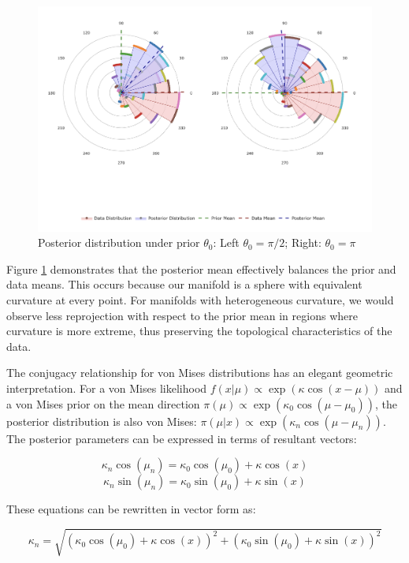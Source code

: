 \documentclass[twoside,11pt]{article}
\begin{document}
\begin{figure}[h!]
  \begin{center}
    \includegraphics[width=1\textwidth]{../fig/posterior-roseplot.png}
  \end{center}
  \caption{Posterior distribution under prior $\theta_0$: Left $\theta_0 = \pi/2$; Right: $\theta_0 = \pi$}\label{fig:posteriors}
\end{figure}

Figure \ref{fig:posteriors} demonstrates that the posterior mean effectively balances the prior and data means. This occurs because our manifold is a sphere with equivalent curvature at every point. For manifolds with heterogeneous curvature, we would observe less reprojection with respect to the prior mean in regions where curvature is more extreme, thus preserving the topological characteristics of the data.

The conjugacy relationship for von Mises distributions has an elegant geometric interpretation. For a von Mises likelihood $f(x|\mu) \propto \exp(\kappa \cos(x-\mu))$ and a von Mises prior on the mean direction $\pi(\mu) \propto \exp(\kappa_0 \cos(\mu-\mu_0))$, the posterior distribution is also von Mises: $\pi(\mu|x) \propto \exp(\kappa_n \cos(\mu-\mu_n))$. The posterior parameters can be expressed in terms of resultant vectors:

$$\kappa_n\cos(\mu_n) = \kappa_0\cos(\mu_0) + \kappa\cos(x)$$
$$\kappa_n\sin(\mu_n) = \kappa_0\sin(\mu_0) + \kappa\sin(x)$$

These equations can be rewritten in vector form as:

$$\kappa_n = \sqrt{(\kappa_0\cos(\mu_0) + \kappa\cos(x))^2 + (\kappa_0\sin(\mu_0) + \kappa\sin(x))^2}$$
\end{document}
